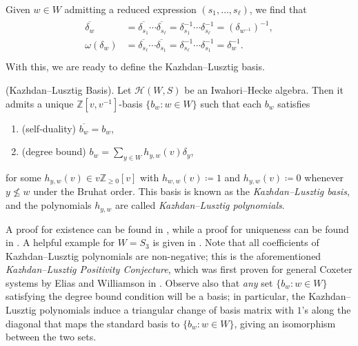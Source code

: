 \noindent \noindent Given $w \in W$ admitting a reduced expression $(s_1, \dots, s_\ell)$, we find that
\begin{align*}
\begin{split}
\overline{\delta_w} &= \overline{\delta_{s_1}}\cdots\overline{\delta_{s_\ell}} = \delta_{s_1}^{-1}\cdots \delta_{s_\ell}^{-1} = (\delta_{w^{-1}})^{-1},\\
\omega(\delta_w) &= \overline{\delta_{s_\ell}}\cdots\overline{\delta_{s_1}} = \delta_{s_\ell}^{-1}\cdots \delta_{s_1}^{-1} = \delta_w^{-1}.\\
\end{split}
\end{align*}
\noindent With this, we are ready to define the Kazhdan--Lusztig basis.\\

\noindent\begin{theoremdefinition}\textup{(Kazhdan--Lusztig Basis).} Let $\mathscr{H}(W, S)$ be an Iwahori--Hecke algebra. Then it admits a unique $\mathbb{Z}[v, v^{-1}]$-basis $\{b_w : w \in W\}$ such that each $b_w$ satisfies
\begin{enumerate}[label=$\bullet$, leftmargin=4\parindent]
\item (self-duality) $\overline{b_w} = b_w$,
\item (degree bound) $b_w = \sum_{y \in W}{h_{y,w}(v) \delta_y}$,
\end{enumerate}
\noindent for some $h_{y,w}(v) \in v\mathbb{Z}_{\geq 0}[v]$ with $h_{w,w}(v) \coloneqq 1$ and $h_{y,w}(v) \coloneqq 0$ whenever $y \nleq w$ under the Bruhat order. This basis is known as the {\em Kazhdan--Lusztig basis}, and the polynomials $h_{y,w}$ are called {\em Kazhdan--Lusztig polynomials}.\\
\end{theoremdefinition}

\noindent A proof for existence can be found in \cite[Theorem 3.25]{EMTW20}, while a proof for uniqueness can be found in \cite[Lemma 3.10]{EMTW20}. A helpful example for $W = S_3$ is given in \cite[\S 3.3.1]{EMTW20}. Note that all coefficients of Kazhdan--Lusztig polynomials are non-negative; this is the aforementioned {\em Kazhdan--Lusztig Positivity Conjecture}, which was first proven for general Coxeter systems by Elias and Williamson in \cite[Corollary 1.2]{EW14}. Observe also that {\em any} set $\{b_w : w \in W\}$ satisfying the degree bound condition will be a basis; in particular, the Kazhdan--Lusztig polynomials induce a triangular change of basis matrix with $1$'s along the diagonal that maps the standard basis to $\{b_w : w \in W\}$, giving an isomorphism between the two sets.\\

